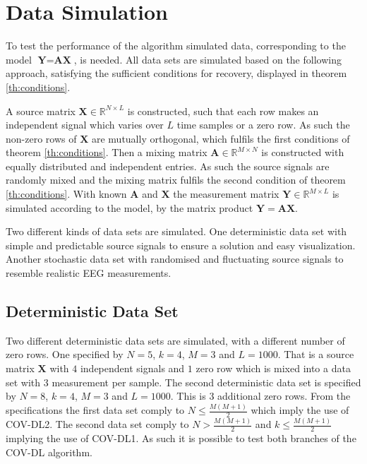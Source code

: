 \section{Data Simulation}\label{sec:dataset}
To test the performance of the algorithm simulated data, corresponding to the model $\textbf{Y}=\textbf{A}\textbf{X}$, is needed. All data sets are simulated based on the following approach, satisfying the sufficient conditions for recovery, displayed in theorem \ref{th:conditions}.
 
A source matrix $\mathbf{X} \in \mathbb{R}^{N \times L}$ is constructed, such that each row makes an independent signal which varies over $L$ time samples or a zero row. As such the non-zero rows of $\mathbf{X}$ are mutually orthogonal, which fulfils the first conditions of theorem \ref{th:conditions}.   
Then a mixing matrix $\mathbf{A} \in \mathbb{R}^{M \times N}$ is constructed with equally distributed and independent entries. As such the source signals are randomly mixed and the mixing matrix fulfils the second condition of theorem \ref{th:conditions}.
With known $\mathbf{A}$ and $\mathbf{X}$ the measurement matrix $\mathbf{Y} \in \mathbb{R}^{M \times L}$ is simulated according to the model, by the matrix product $\mathbf{Y} = \mathbf{AX}$.  

Two different kinds of data sets are simulated.
One deterministic data set with simple and predictable source signals to ensure a solution and easy visualization.
Another stochastic data set with randomised and fluctuating source signals to resemble realistic EEG measurements.

\subsection{Deterministic Data Set}\label{subseg_simpledata}
Two different deterministic data sets are simulated, with a different number of zero rows. 
One specified by $N = 5$, $k = 4$, $M = 3$ and $L = 1000$. That is a source matrix $\mathbf{X}$ with $4$ independent signals and $1$ zero row which is mixed into a data set with $3$ measurement per sample.  
The second deterministic data set is specified by $N = 8$, $k = 4$, $M = 3$ and $L = 1000$. This is 3 additional zero rows.
From the specifications the first data set comply to $N \leq \frac{M(M+1)}{2}$ which imply the use of COV-DL2.
The second data set comply to $N > \frac{M(M+1)}{2}$ and $k \leq \frac{M(M+1)}{2}$ implying the use of COV-DL1. As such it is possible to test both branches of the COV-DL algorithm. 
     
